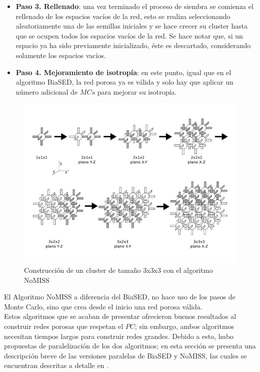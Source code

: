 \begin{itemize}
\item[] \textbf{Paso 3. Rellenado}: una vez terminado el proceso de siembra se comienza el rellenado de los espacios vacíos de la red, esto se realiza 
seleccionando aleatoriamente una de las semillas iniciales y se hace crecer su cluster hasta que se ocupen todos los espacios vacíos de la red.
Se hace notar que, si un espacio ya ha sido previamente inicializado, éste es descartado, considerando solamente los espacios vacíos.

\item[] \textbf{Paso 4. Mejoramiento de isotrop\'ia}: en este punto, igual que en el algoritmo BiaSED, la red porosa ya es v\'alida y solo hay que 
aplicar un n\'umero adicional de $MCs$ para mejorar su isotrop\'ia.
\end{itemize}

\begin{figure}[hbtp]
\centering
\includegraphics[width=5.0in]{img/cluster-nomiss_es.pdf}
\caption{Construcción de un cluster de tamaño 3x3x3 con el algoritmo NoMISS}
\label{fig:cluster_nomiss}
\end{figure}

El Algoritmo NoMISS a diferencia del BiaSED, no hace uso de los pasos de Monte Carlo, sino que crea desde el inicio una red porosa válida.\\
Estos algoritmos que se acaban de presentar ofrecieron buenos resultados al construir redes porosas que respetan el $PC$; sin 
embargo, ambos algoritmos necesitan tiempos largos para construir redes grandes. Debido a esto, hubo propuestas de paralelización de los
dos algoritmos; en esta sección se presenta una descripción breve de las versiones paralelas de BiaSED y NoMISS, las cuales se encuentran 
descritas a detalle en \cite{ref4}.


